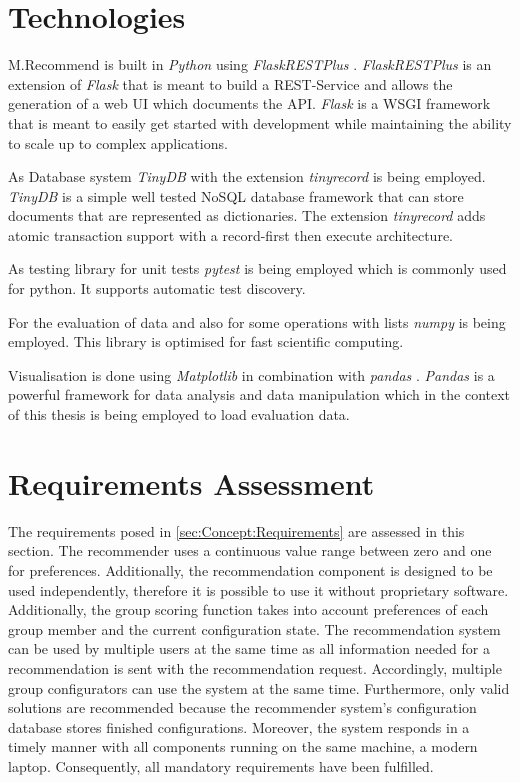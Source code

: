 \section{Technologies}
\label{sec:DesignImplementation:Technologies}

M.Recommend is built in \emph{Python} \cite{PythonOrg} using \emph{FlaskRESTPlus} \cite{FlaskRESTPlus13Documentation}. \emph{FlaskRESTPlus} is an extension of \emph{Flask} \cite{FlaskDocumentation} that is meant to build a REST-Service and allows the generation of a web UI which documents the API. \emph{Flask} is a WSGI \cite{WhatWSGI} framework that is meant to easily get started with development while maintaining the ability to scale up to complex applications.

As Database system \emph{TinyDB} \cite{TinyDB15Documentation} with the extension \emph{tinyrecord} \cite{junEugeneeeoTinyrecord2020} is being employed. \emph{TinyDB} is a simple well tested NoSQL database framework that can store documents that are represented as dictionaries. The extension \emph{tinyrecord} adds atomic transaction support with a record-first then execute architecture.

As testing library for unit tests \emph{pytest} \cite{PytestDocumentation} is being employed which is commonly used for python. It supports automatic test discovery.

For the evaluation of data and also for some operations with lists \emph{numpy} \cite{NumPy} is being employed. This library is optimised for fast scientific computing. 

Visualisation is done using \emph{Matplotlib} \cite{MatplotlibDocumentation} in combination with \emph{pandas} \cite{PandasPythonData}. \emph{Pandas} is a powerful framework for data analysis and data manipulation which in the context of this thesis is being employed to load evaluation data.


\section{Requirements Assessment}
\label{sec:DesignImplementation:RequirementsAssesment}

The requirements posed in \autoref{sec:Concept:Requirements} are assessed in this section. The recommender uses a continuous value range between zero and one for preferences. Additionally, the recommendation component is designed to be used independently, therefore it is possible to use it without proprietary software.
Additionally, the group scoring function takes into account preferences of each group member and the current configuration state. The recommendation system can be used by multiple users at the same time as all information needed for a recommendation is sent with the recommendation request. Accordingly, multiple group configurators can use the system at the same time. Furthermore, only valid solutions are recommended because the recommender system's configuration database stores finished configurations. Moreover, the system responds in a timely manner with all components running on the same machine, a modern laptop.
Consequently, all mandatory requirements have been fulfilled.

